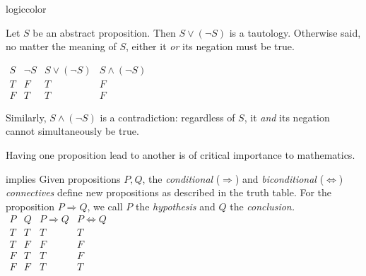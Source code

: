 \begin{examples}{}{logiccolor}
\begin{enumerate}
	
		\begin{minipage}[t]{0.64\linewidth}\vspace{0pt}
  		\item Let $S$ be an abstract proposition. Then $S\vee (\neg S)$ is a tautology. Otherwise said, no matter the meaning of $S$, either it \emph{or} its negation must be true.
  	\end{minipage}
  	\hfill
  	\begin{minipage}[t]{0.33\linewidth}\vspace{0pt}
			$\begin{array}{cc||c|c}
				S & \neg S & S\vee (\neg S) & S\wedge(\neg S)\\\hline
				T & F & T & F\\
				F & T & T & F
			\end{array}$
  	\end{minipage}\par
  	Similarly, $S\wedge(\neg S)$ is a contradiction: regardless of $S$, it \emph{and} its negation cannot simultaneously be true.
  	
	\end{enumerate}
\end{examples}



Having one proposition lead to another is of critical importance to mathematics.

\begin{defn}[lower separated=false, sidebyside, sidebyside align=top seam, sidebyside gap=0pt, righthand width=0.37\linewidth]{}{implies}
	Given propositions $P,Q$, the \emph{conditional} ($\Rightarrow$) and \emph{biconditional} ($\Leftrightarrow$) \emph{connectives} define new propositions as described in the truth table.\smallbreak
	For the proposition $P\Longrightarrow Q$, we call $P$ the \emph{hypothesis} and $Q$ the \emph{conclusion.}
	\tcblower
	\flushright%
	$\begin{array}{cc||c|c}
		P & Q & P\Longrightarrow Q & P\Longleftrightarrow Q\\\hline
		T & T & T & T\\
		T & F & F & F\\
		F & T & T & F\\
		F & F & T & T
	\end{array}$
\end{defn}


